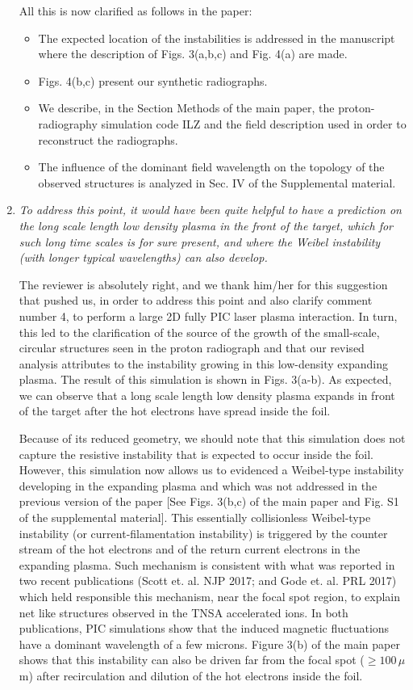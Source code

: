 \documentclass[aps,showpacs,superscriptaddress]{revtex4}%
\begin{document}
\begin{enumerate}
All this is now clarified as follows in the paper:
\begin{itemize}
    \item The expected location of the instabilities is addressed in the manuscript where the description of  Figs. 3(a,b,c) and Fig. 4(a) are made.
    \item Figs. 4(b,c) present our synthetic radiographs.
    \item We describe,  in the Section Methods of the main paper,  the proton-radiography simulation code ILZ and the field description used in order to reconstruct the radiographs.
    \item The influence of the dominant field wavelength on the topology of the observed structures is analyzed in Sec. IV of the Supplemental material. 
\end{itemize}

\item \textit{To address this point, it would have been quite helpful to have a prediction on the long scale length low density plasma in the front of the target, which for such long time scales is for sure present, and where the Weibel instability (with longer typical wavelengths) can also develop. }

The reviewer is absolutely right, and we thank him/her for this suggestion that pushed us, in order to address this point and also clarify comment number 4, to perform a large 2D fully  PIC laser plasma interaction. In turn, this led to the clarification of the source of the growth of the small-scale, circular structures seen in the proton radiograph and that our revised analysis attributes to the instability growing in this low-density expanding plasma.
The result of this simulation is shown in Figs. 3(a-b). As expected, we can observe that a long scale length low density plasma expands in front of the target after the hot electrons have spread inside the foil.

Because of its reduced geometry, we should note that this simulation does not capture the resistive instability that is expected to occur inside the foil. However, this simulation now allows us to evidenced a Weibel-type instability developing in the expanding plasma and which  was not addressed in the previous version of the paper [See Figs. 3(b,c) of the main paper and Fig. S1 of the supplemental material].
This essentially collisionless Weibel-type instability (or current-filamentation instability) is triggered by the counter stream of the hot electrons and of the  return current electrons in the expanding plasma. 
Such mechanism is consistent with what was reported in two recent publications (Scott et. al. NJP 2017; and Gode et. al. PRL 2017) which  held responsible this mechanism, near the focal spot region, to explain net like structures observed in the TNSA accelerated ions. In both publications, PIC simulations show that the induced magnetic fluctuations  have a dominant wavelength of a few microns.
Figure 3(b) of the main paper shows that this instability can also be driven far from the focal spot ($\ge 100\, \mu$m) after recirculation and dilution  of the hot electrons  inside the foil.


\end{enumerate}
\end{document}
